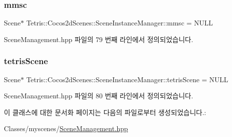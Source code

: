 \subsubsection{\texorpdfstring{mmsc}{mmsc}}
{\footnotesize\ttfamily Scene$\ast$ Tetris\+::\+Cocos2d\+Scenes\+::\+Scene\+Instance\+Manager\+::mmsc = N\+U\+LL\hspace{0.3cm}{\ttfamily [protected]}}



Scene\+Management.\+hpp 파일의 79 번째 라인에서 정의되었습니다.

\mbox{\label{class_tetris_1_1_cocos2d_scenes_1_1_scene_instance_manager_a7952a2c89cda55aba40056a7c9236ded}} 
\subsubsection{\texorpdfstring{tetris\+Scene}{tetrisScene}}
{\footnotesize\ttfamily Scene$\ast$ Tetris\+::\+Cocos2d\+Scenes\+::\+Scene\+Instance\+Manager\+::tetris\+Scene = N\+U\+LL\hspace{0.3cm}{\ttfamily [protected]}}



Scene\+Management.\+hpp 파일의 80 번째 라인에서 정의되었습니다.



이 클래스에 대한 문서화 페이지는 다음의 파일로부터 생성되었습니다.\+:\begin{DoxyCompactItemize}
\item 
Classes/myscenes/\hyperlink{_scene_management_8hpp}{Scene\+Management.\+hpp}\end{DoxyCompactItemize}
